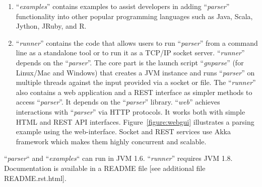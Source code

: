 \documentclass{bmcart}
\begin{document}
\begin{enumerate}
  \item ``\textit{examples}'' contains examples to assist developers in adding
    ``\textit{parser}'' functionality into other popular programming languages
    such as Java, Scala, Jython, JRuby, and R.

  \item ``\textit{runner}'' contains the code that allows users to run
    ``\textit{parser}'' from a command line as a standalone tool or to run it
    as a TCP/IP socket server. ``\textit{runner}'' depends on the
    ``\textit{parser}''.   The core part is the launch script
    ``\textit{gnparse}'' (for Linux/Mac and Windows) that creates a JVM
    instance and runs ``\textit{parser}'' on multiple threads against the input
    provided via a socket or file. The ``\textit{runner}'' also contains a web
    application and a REST interface as simpler methods to access
    ``\textit{parser}''. It depends on the ``\textit{parser}'' library.
    ``\textit{web}'' achieves interactions with ``\textit{parser}'' via HTTP
    protocols. It works both with simple HTML and REST API interfaces.
    Figure~\ref{figure:webgui} illustrates a parsing example using the
    web-interface. Socket and REST services use Akka framework which makes them
    highly concurrent and scalable.

\end{enumerate}

``\textit{parser}`` and ``\textit{examples}`` can run in JVM 1.6.
``\textit{runner}'' requires JVM 1.8. Documentation is available in a README
file [see additional file README.rst.html].
\end{document}
